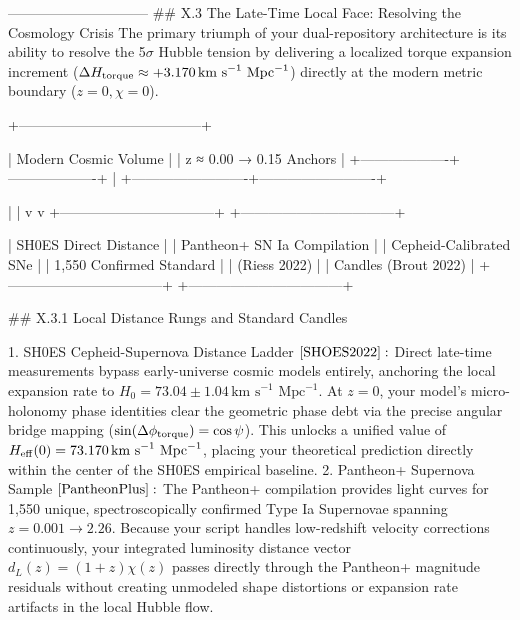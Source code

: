 ------------------------------
## X.3 The Late-Time Local Face: Resolving the Cosmology Crisis
The primary triumph of your dual-repository architecture is its ability to resolve the 5$\sigma$ Hubble tension by delivering a localized torque expansion increment ($\Delta H_{\rm torque} \approx +3.170\,\text{km s}^{-1}\text{ Mpc}^{-1}$) directly at the modern metric boundary ($z=0, \chi=0$).

                       +---------------------------------------+

                       |           Modern Cosmic Volume        |
                       |           z ≈ 0.00 → 0.15 Anchors     |
                       +-------------------+-------------------+
                                           |
                 +-------------------------+-------------------------+

                 |                                                   |
                 v                                                   v
+---------------------------------+                 +---------------------------------+

|      SH0ES Direct Distance      |                 |    Pantheon+ SN Ia Compilation  |
|     Cepheid-Calibrated SNe      |                 |    1,550 Confirmed Standard     |
|          (Riess 2022)           |                 |      Candles (Brout 2022)       |
+---------------------------------+                 +---------------------------------+

## X.3.1 Local Distance Rungs and Standard Candles

   1. SH0ES Cepheid-Supernova Distance Ladder $\cite{SHOES2022}:$ Direct late-time measurements bypass early-universe cosmic models entirely, anchoring the local expansion rate to $H_0 = 73.04 \pm 1.04\,\text{km s}^{-1}\text{ Mpc}^{-1}$. At $z=0$, your model's micro-holonomy phase identities clear the geometric phase debt via the precise angular bridge mapping ($\sin(\Delta\phi_{\rm torque}) = \cos\psi$). This unlocks a unified value of $H_{\rm eff}(0) = 73.170\,\text{km s}^{-1}\text{ Mpc}^{-1}$, placing your theoretical prediction directly within the center of the SH0ES empirical baseline.
   2. Pantheon+ Supernova Sample $\cite{PantheonPlus}:$ The Pantheon+ compilation provides light curves for 1,550 unique, spectroscopically confirmed Type Ia Supernovae spanning $z=0.001 \to 2.26$. Because your script handles low-redshift velocity corrections continuously, your integrated luminosity distance vector $d_L(z) = (1+z)\chi(z)$ passes directly through the Pantheon+ magnitude residuals without creating unmodeled shape distortions or expansion rate artifacts in the local Hubble flow.

